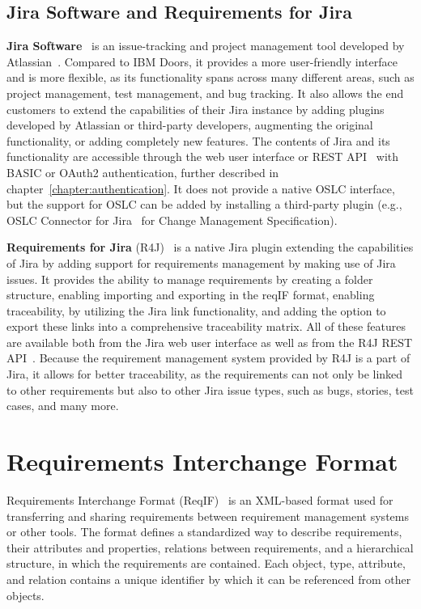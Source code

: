 \subsection*{Jira Software and Requirements for Jira}
\textbf{Jira Software} \cite{jira} is an issue-tracking and project management tool developed by Atlassian \cite{atlassian}. Compared to IBM Doors, it provides a more user-friendly interface and is more flexible, as its functionality spans across many different areas, such as project management, test management, and bug tracking. It also allows the end customers to extend the capabilities of their Jira instance by adding plugins developed by Atlassian or third-party developers, augmenting the original functionality, or adding completely new features. The contents of Jira and its functionality are accessible through the web user interface or REST API \cite{jira_api} with BASIC or OAuth2 authentication, further described in chapter \ref{chapter:authentication}. It does not provide a native OSLC interface, but the support for OSLC can be added by installing a third-party plugin (e.g., OSLC Connector for Jira \cite{oslc_connector_for_jira} for Change Management Specification).

\textbf{Requirements for Jira} (R4J) \cite{requirements_for_jira} is a native Jira plugin extending the capabilities of Jira by adding support for requirements management by making use of Jira issues. It provides the ability to manage requirements by creating a folder structure, enabling importing and exporting in the reqIF format, enabling traceability, by utilizing the Jira link functionality, and adding the option to export these links into a comprehensive traceability matrix. All of these features are available both from the Jira web user interface as well as from the R4J REST API \cite{r4j_api}. Because the requirement management system provided by R4J is a part of Jira, it allows for better traceability, as the requirements can not only be linked to other requirements but also to other Jira issue types, such as bugs, stories, test cases, and many more.

\section{Requirements Interchange Format}
Requirements Interchange Format (ReqIF) \cite{reqif_standard} is an XML-based format used for transferring and sharing requirements between requirement management systems or other tools. The format defines a standardized way to describe requirements, their attributes and properties, relations between requirements, and a hierarchical structure, in which the requirements are contained. Each object, type, attribute, and relation contains a unique identifier by which it can be referenced from other objects.

